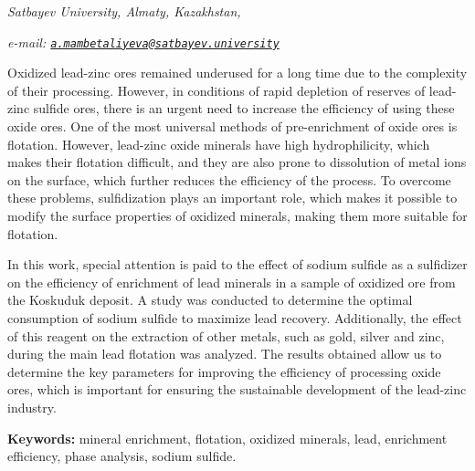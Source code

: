 \begin{affiliation}
\emph{Satbayev University, Almaty, Kazakhstan,}

\emph{e-mail: \href{mailto:a.mambetaliyeva@satbayev.university}{\nolinkurl{a.mambetaliyeva@satbayev.university}}}
\end{affiliation}

Oxidized lead-zinc ores remained underused for a long time due to the
complexity of their processing. However, in conditions of rapid
depletion of reserves of lead-zinc sulfide ores, there is an urgent need
to increase the efficiency of using these oxide ores. One of the most
universal methods of pre-enrichment of oxide ores is flotation. However,
lead-zinc oxide minerals have high hydrophilicity, which makes their
flotation difficult, and they are also prone to dissolution of metal
ions on the surface, which further reduces the efficiency of the
process. To overcome these problems, sulfidization plays an important
role, which makes it possible to modify the surface properties of
oxidized minerals, making them more suitable for flotation.

In this work, special attention is paid to the effect of sodium sulfide
as a sulfidizer on the efficiency of enrichment of lead minerals in a
sample of oxidized ore from the Koskuduk deposit. A study was conducted
to determine the optimal consumption of sodium sulfide to maximize lead
recovery. Additionally, the effect of this reagent on the extraction of
other metals, such as gold, silver and zinc, during the main lead
flotation was analyzed. The results obtained allow us to determine the
key parameters for improving the efficiency of processing oxide ores,
which is important for ensuring the sustainable development of the
lead-zinc industry.

{\bfseries Keywords:} mineral enrichment, flotation, oxidized minerals,
lead, enrichment efficiency, phase analysis, sodium sulfide.

